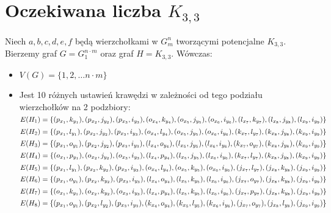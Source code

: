 \documentclass{article}
\begin{document}
\section{Oczekiwana liczba $K_{3,3}$}
Niech $a,b,c,d,e,f$ będą wierzchołkami w $G_m^n$ tworzącymi potencjalne $K_{3,3}$. Bierzemy graf $G=G^{n \cdot m}_1$ oraz graf $H = K_{3,3}$. Wówczas:
\begin{itemize}
  \item $V(G) = \{ 1,2,\ldots n \cdot m \}$
  \item Jest 10 różnych ustawień krawędzi w zależności od tego podziału wierzchołków na 2 podzbiory:
    \subitem $E(H_1) = \{ (p_{x_1}, k_{y_1}), (p_{x_2}, j_{y_2}), (p_{x_3}, i_{y_3}), \newline (o_{x_4}, k_{y_4}), (o_{x_5}, j_{y_5}), (o_{x_6}, i_{y_6}), (l_{x_7}, k_{y_7}), (l_{x_8}, j_{y_8}), (l_{x_9}, i_{y_9}) \}$
    \subitem $E(H_2) = \{ (p_{x_1}, l_{y_1}), (p_{x_2}, j_{y_2}), (p_{x_3}, i_{y_3}), \newline (o_{x_4}, l_{y_4}), (o_{x_5}, j_{y_5}), (o_{x_6}, i_{y_6}), (k_{x_7}, l_{y_7}), (k_{x_8}, j_{y_8}), (k_{x_9}, i_{y_9}) \}$
    \subitem $E(H_3) = \{ (p_{x_1}, o_{y_1}), (p_{x_2}, j_{y_2}), (p_{x_3}, i_{y_3}), \newline (l_{x_4}, o_{y_4}), (l_{x_5}, j_{y_5}), (l_{x_6}, i_{y_6}), (k_{x_7}, o_{y_7}), (k_{x_8}, j_{y_8}), (k_{x_9}, i_{y_9}) \}$
    \subitem $E(H_4) = \{ (o_{x_1}, p_{y_1}), (o_{x_2}, j_{y_2}), (o_{x_3}, i_{y_3}), \newline (l_{x_4}, p_{y_4}), (l_{x_5}, j_{y_5}), (l_{x_6}, i_{y_6}), (k_{x_7}, l_{y_7}), (k_{x_8}, j_{y_8}), (k_{x_9}, i_{y_9}) \}$
    \subitem $E(H_5) = \{ (p_{x_1}, l_{y_1}), (p_{x_2}, k_{y_2}), (p_{x_3}, i_{y_3}), \newline (o_{x_4}, l_{y_4}), (o_{x_5}, k_{y_5}), (o_{x_6}, i_{y_6}), (j_{x_7}, l_{y_7}), (j_{x_8}, k_{y_8}), (j_{x_9}, i_{y_9}) \}$
    \subitem $E(H_6) = \{ (p_{x_1}, o_{y_1}), (p_{x_2}, k_{y_2}), (p_{x_3}, i_{y_3}), \newline (l_{x_4}, o_{y_4}), (l_{x_5}, k_{y_5}), (l_{x_6}, i_{y_6}), (j_{x_7}, o_{y_7}), (j_{x_8}, k_{y_8}), (j_{x_9}, i_{y_9}) \}$
    \subitem $E(H_7) = \{ (o_{x_1}, k_{y_1}), (o_{x_2}, k_{y_2}), (o_{x_3}, i_{y_3}), \newline (l_{x_4}, p_{y_4}), (l_{x_5}, k_{y_5}), (l_{x_6}, i_{y_6}), (j_{x_7}, p_{y_7}), (j_{x_8}, k_{y_8}), (j_{x_9}, i_{y_9}) \}$
    \subitem $E(H_8) = \{ (p_{x_1}, o_{y_1}), (p_{x_2}, l_{y_2}), (p_{x_3}, i_{y_3}), \newline (k_{x_4}, o_{y_4}), (k_{x_5}, l_{y_5}), (k_{x_6}, i_{y_6}), (j_{x_7}, o_{y_7}), (j_{x_8}, l_{y_8}), (j_{x_9}, i_{y_9}) \}$

\end{itemize}
\end{document}
